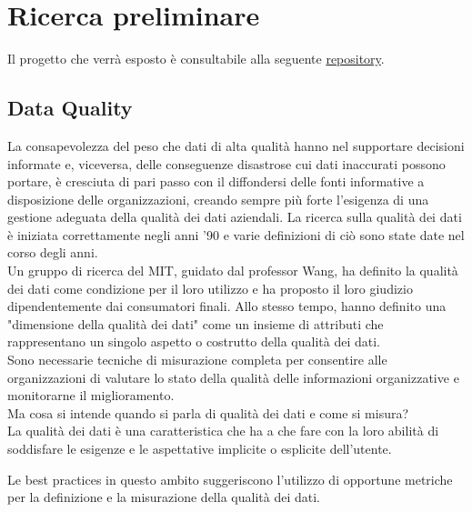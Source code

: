 \documentclass[a4paper,12pt]{article}
\begin{document}
\tableofcontents

\newpage

\section{Ricerca preliminare} 

Il progetto che verrà esposto è consultabile alla seguente \href{https://github.com/ivemberg/Data_quality_experimentation}{repository}.

\subsection{Data Quality}

La consapevolezza del peso che dati di alta qualità hanno nel supportare decisioni informate e, viceversa, delle conseguenze disastrose cui dati inaccurati possono portare, è cresciuta di pari passo con il diffondersi delle fonti informative a disposizione delle organizzazioni, creando sempre più forte l’esigenza di una gestione adeguata della qualità dei dati aziendali. La ricerca sulla qualità dei dati è iniziata correttamente negli anni '90 e varie definizioni di ciò sono state date nel corso degli anni. \\

\noindent Un gruppo di ricerca del MIT, guidato dal professor Wang, ha definito la qualità dei dati come condizione per il loro utilizzo e ha proposto il loro giudizio dipendentemente dai consumatori finali. Allo stesso tempo, hanno definito una "dimensione della qualità dei dati" come un insieme di attributi che rappresentano un singolo aspetto o costrutto della qualità dei dati. \\

\noindent Sono necessarie tecniche di misurazione completa per consentire alle organizzazioni di valutare lo stato della qualità delle informazioni organizzative e monitorarne il miglioramento. \\

\noindent Ma cosa si intende quando si parla di qualità dei dati e come si misura? \\
La qualità dei dati è una caratteristica che ha a che fare con la loro abilità di soddisfare le esigenze e le aspettative implicite o esplicite dell'utente. 

\noindent Le best practices in questo ambito suggeriscono l’utilizzo di opportune metriche per la definizione e la misurazione della qualità dei dati. 
\end{document}
